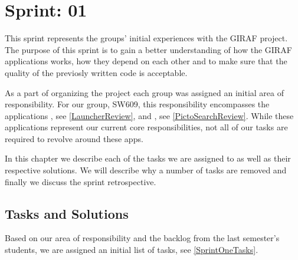 \chapter{Sprint: 01}
This sprint represents the groups' initial experiences with the GIRAF
project. The purpose of this sprint is to gain a better understanding of how the
GIRAF applications works, how they depend on each other and to make sure that
the quality of the previosly written code is acceptable.\nl

As a part of organizing the project each group was assigned an initial area of
responsibility. For our group, SW609, this responsibility encompasses the
applications , see \autoref{LauncherReview}, and
, see \autoref{PictoSearchReview}. While these
applications represent our current core responsibilities, not all of our tasks
are required to revolve around these apps.\nl

In this chapter we describe each of the tasks we are assigned to as
well as their respective solutions. We will describe why a number of tasks are
removed and finally we discuss the sprint retrospective.

\section{Tasks and Solutions}
Based on our area of responsibility and the backlog from the last semester's
students, we are assigned an initial list of tasks, see
\autoref{SprintOneTasks}.

